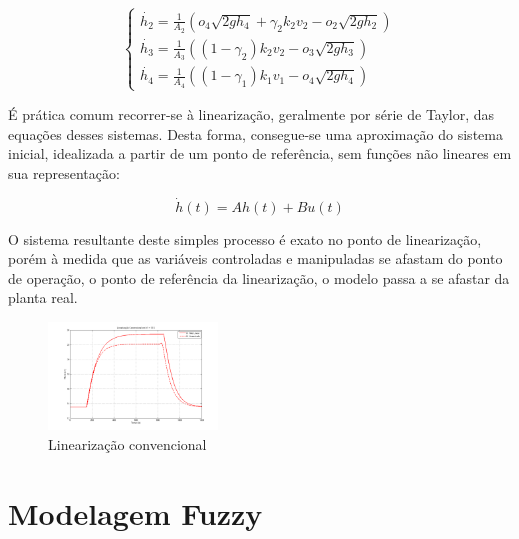 \documentclass[a0,portrait]{a0poster}
\begin{document}
\begin{multicols}{2}
\begin{equation}
\begin{cases}
		\dot{h_{2}} = \frac{1}{A_{2}}(o_{4}\sqrt{2gh_{4}} + \gamma_{2}k_{2}v_{2} - o_{2}\sqrt{2gh_{2}})\\
		
		\dot{h_{3}} = \frac{1}{A_{3}}((1 - \gamma_{2})k_{2}v_{2} - o_{3}\sqrt{2gh_{3}})\\
		
		\dot{h_{4}} = \frac{1}{A_{4}}((1 - \gamma_{1})k_{1}v_{1} - o_{4}\sqrt{2gh_{4}})
	\end{cases}
\end{equation}
\vspace{0.4cm}

É prática comum recorrer-se à linearização, geralmente por série de Taylor, das equações desses sistemas. Desta forma, consegue-se uma aproximação do sistema inicial, idealizada a partir de um ponto de referência, sem funções não lineares em sua representação:

\vspace{0.2cm}
\begin{equation}
	\dot{h}(t) =  Ah(t) + Bu(t)
\end{equation}
\vspace{0.4cm}


O sistema resultante deste simples processo é exato no ponto de linearização, porém à medida que as variáveis controladas e manipuladas se afastam do ponto de operação, o ponto de referência da linearização, o modelo passa a se afastar da planta real.

\begin{figure}[H]
	\centering
	\includegraphics[width=0.4\textwidth]{imgs/v2_linear_conv.png}
	\caption{Linearização convencional}
	\label{figLinConv}
\end{figure}


\vspace{1cm}
\color{DarkSlateGray} %

\section*{Modelagem Fuzzy}


\end{multicols}
\end{document}

